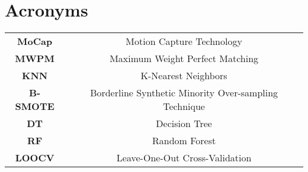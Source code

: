 \section*{\Huge Acronyms}



\begin{table}[H]
    \begin{tabular}{c c}
        \textbf{MoCap} & Motion Capture Technology \\
        \textbf{MWPM} & Maximum Weight Perfect Matching \\
        \textbf{KNN} & K-Nearest Neighbors \\
        \textbf{B-SMOTE} & Borderline Synthetic Minority Over-sampling Technique \\
        \textbf{DT} & Decision Tree \\
        \textbf{RF} & Random Forest \\
        \textbf{LOOCV} & Leave-One-Out Cross-Validation \\
    \end{tabular}
\end{table}